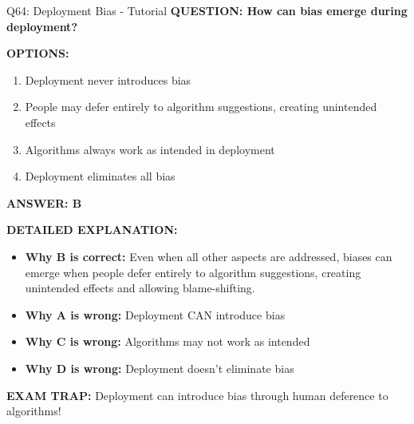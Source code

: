 \documentclass[8pt]{beamer}
\begin{document}
	\begin{frame}{Q64: Deployment Bias - Tutorial}
		\fontsize{6.5}{7.5}\selectfont
		\textbf{QUESTION: How can bias emerge during deployment?}
		
		\vspace{0.1cm}
		\textbf{OPTIONS:}
		\begin{enumerate}
			\item Deployment never introduces bias
			\item People may defer entirely to algorithm suggestions, creating unintended effects
			\item Algorithms always work as intended in deployment
			\item Deployment eliminates all bias
		\end{enumerate}
		
		\vspace{0.1cm}
		\textcolor{myblue}{\textbf{ANSWER: B}}
		
		\vspace{0.1cm}
		\textbf{DETAILED EXPLANATION:}
		\begin{itemize}
			\item \textbf{Why B is correct:} Even when all other aspects are addressed, biases can emerge when people defer entirely to algorithm suggestions, creating unintended effects and allowing blame-shifting.
			\item \textbf{Why A is wrong:} Deployment CAN introduce bias
			\item \textbf{Why C is wrong:} Algorithms may not work as intended
			\item \textbf{Why D is wrong:} Deployment doesn't eliminate bias
		\end{itemize}
		
		\textcolor{myred}{\textbf{EXAM TRAP:}} Deployment can introduce \textcolor{myblue}{bias through human deference to algorithms}!
	\end{frame}
	
\end{document}

